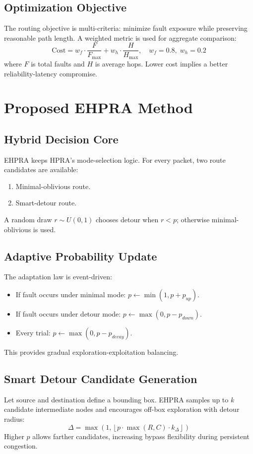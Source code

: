 \documentclass[10pt,a4paper]{article}
\begin{document}
\subsection{Optimization Objective}
The routing objective is multi-criteria: minimize fault exposure while preserving reasonable path length. A weighted metric is used for aggregate comparison:
\begin{equation}
\mathrm{Cost} = w_f \cdot \frac{F}{F_{\max}} + w_h \cdot \frac{H}{H_{\max}},\quad w_f=0.8,\;w_h=0.2
\end{equation}
where $F$ is total faults and $H$ is average hops. Lower cost implies a better reliability-latency compromise.

\section{Proposed EHPRA Method}
\subsection{Hybrid Decision Core}
EHPRA keeps HPRA's mode-selection logic. For every packet, two route candidates are available:
\begin{enumerate}[leftmargin=6mm]
    \item Minimal-oblivious route.
    \item Smart-detour route.
\end{enumerate}
A random draw $r\sim U(0,1)$ chooses detour when $r<p$; otherwise minimal-oblivious is used.

\subsection{Adaptive Probability Update}
The adaptation law is event-driven:
\begin{itemize}[leftmargin=6mm]
    \item If fault occurs under minimal mode: $p \leftarrow \min(1, p + p_{up})$.
    \item If fault occurs under detour mode: $p \leftarrow \max(0, p - p_{down})$.
    \item Every trial: $p \leftarrow \max(0, p - p_{decay})$.
\end{itemize}
This provides gradual exploration-exploitation balancing.

\subsection{Smart Detour Candidate Generation}
Let source and destination define a bounding box. EHPRA samples up to $k$ candidate intermediate nodes and encourages off-box exploration with detour radius:
\begin{equation}
\Delta = \max\left(1, \left\lfloor p\cdot\max(R,C)\cdot k_{\Delta}\right\rfloor\right)
\end{equation}
Higher $p$ allows farther candidates, increasing bypass flexibility during persistent congestion.
\end{document}
